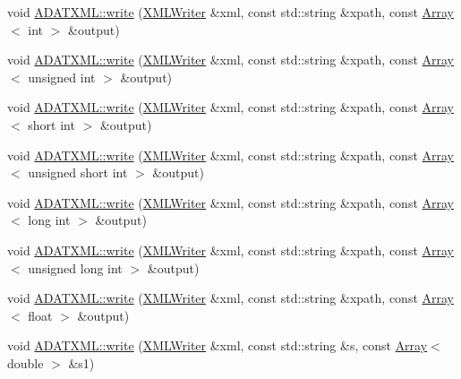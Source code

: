 \begin{DoxyCompactItemize}
void \mbox{\hyperlink{group__io_ga79aaea02aba2cdc3c3374686eca9fd1e}{A\+D\+A\+T\+X\+M\+L\+::write}} (\mbox{\hyperlink{classADATXML_1_1XMLWriter}{X\+M\+L\+Writer}} \&xml, const std\+::string \&xpath, const \mbox{\hyperlink{classXMLArray_1_1Array}{Array}}$<$ int $>$ \&output)
\item 
void \mbox{\hyperlink{group__io_ga69642f017daf4afef39564d30ba6cba1}{A\+D\+A\+T\+X\+M\+L\+::write}} (\mbox{\hyperlink{classADATXML_1_1XMLWriter}{X\+M\+L\+Writer}} \&xml, const std\+::string \&xpath, const \mbox{\hyperlink{classXMLArray_1_1Array}{Array}}$<$ unsigned int $>$ \&output)
\item 
void \mbox{\hyperlink{group__io_ga5b987571b14df546fba76f92cb272d5d}{A\+D\+A\+T\+X\+M\+L\+::write}} (\mbox{\hyperlink{classADATXML_1_1XMLWriter}{X\+M\+L\+Writer}} \&xml, const std\+::string \&xpath, const \mbox{\hyperlink{classXMLArray_1_1Array}{Array}}$<$ short int $>$ \&output)
\item 
void \mbox{\hyperlink{group__io_gaae1762f924e581123d4df61dff9b9f5b}{A\+D\+A\+T\+X\+M\+L\+::write}} (\mbox{\hyperlink{classADATXML_1_1XMLWriter}{X\+M\+L\+Writer}} \&xml, const std\+::string \&xpath, const \mbox{\hyperlink{classXMLArray_1_1Array}{Array}}$<$ unsigned short int $>$ \&output)
\item 
void \mbox{\hyperlink{group__io_gaa86792c3bbc86036087623eee8f75f15}{A\+D\+A\+T\+X\+M\+L\+::write}} (\mbox{\hyperlink{classADATXML_1_1XMLWriter}{X\+M\+L\+Writer}} \&xml, const std\+::string \&xpath, const \mbox{\hyperlink{classXMLArray_1_1Array}{Array}}$<$ long int $>$ \&output)
\item 
void \mbox{\hyperlink{group__io_gaa89a8fb5de3a6ff255c50428b84a232c}{A\+D\+A\+T\+X\+M\+L\+::write}} (\mbox{\hyperlink{classADATXML_1_1XMLWriter}{X\+M\+L\+Writer}} \&xml, const std\+::string \&xpath, const \mbox{\hyperlink{classXMLArray_1_1Array}{Array}}$<$ unsigned long int $>$ \&output)
\item 
void \mbox{\hyperlink{group__io_ga37bab6df89540c0999683cb373ad2d3d}{A\+D\+A\+T\+X\+M\+L\+::write}} (\mbox{\hyperlink{classADATXML_1_1XMLWriter}{X\+M\+L\+Writer}} \&xml, const std\+::string \&xpath, const \mbox{\hyperlink{classXMLArray_1_1Array}{Array}}$<$ float $>$ \&output)
\item 
void \mbox{\hyperlink{group__io_ga82a292d577216b66e12c9876c7fe7a10}{A\+D\+A\+T\+X\+M\+L\+::write}} (\mbox{\hyperlink{classADATXML_1_1XMLWriter}{X\+M\+L\+Writer}} \&xml, const std\+::string \&s, const \mbox{\hyperlink{classXMLArray_1_1Array}{Array}}$<$ double $>$ \&s1)
\item 

\end{DoxyCompactItemize}

